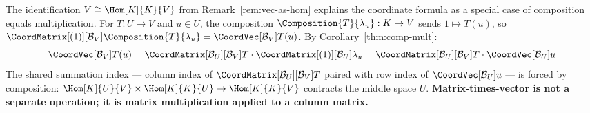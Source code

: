 \begin{remark}
\label{rem:mat-times-vec-composition}
    The identification $V \cong \Hom[K]{K}{V}$ from
    Remark~\ref{rem:vec-as-hom} explains the coordinate formula as a special case
    of composition equals multiplication. For $T: U \to V$ and $u \in U$, the composition
    $\Composition{T}{\lambda_u}: K \to V$ sends $1 \mapsto T(u)$, so
    $\CoordMatrix[(1)][\mathcal{B}_V]{\Composition{T}{\lambda_u}}
    = \CoordVec[\mathcal{B}_V]{T(u)}$.
    By Corollary~\ref{thm:comp-mult}:
    \[
        \CoordVec[\mathcal{B}_V]{T(u)}
        = \CoordMatrix[\mathcal{B}_U][\mathcal{B}_V]{T}
          \cdot \CoordMatrix[(1)][\mathcal{B}_U]{\lambda_u}
        = \CoordMatrix[\mathcal{B}_U][\mathcal{B}_V]{T}
          \cdot \CoordVec[\mathcal{B}_U]{u}
    \]
    The shared summation index --- column index of
    $\CoordMatrix[\mathcal{B}_U][\mathcal{B}_V]{T}$ paired with row index of
    $\CoordVec[\mathcal{B}_U]{u}$ --- is forced by composition:
    $\Hom[K]{U}{V} \times \Hom[K]{K}{U} \to \Hom[K]{K}{V}$ contracts the middle space $U$.
    \textbf{Matrix-times-vector is not a separate operation; it is matrix multiplication
    applied to a column matrix.}
\end{remark}

